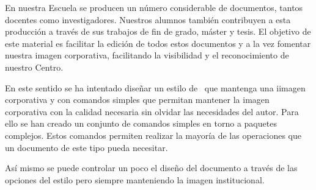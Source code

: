 En nuestra Escuela se producen un número considerable de documentos, tantos docentes
como investigadores. Nuestros alumnos también contribuyen a esta producción a
través de sus trabajos de fin de grado, máster y tesis. El objetivo de este material es facilitar
la edición de todos estos documentos y a la vez fomentar nuestra imagen corporativa,
facilitando la visibilidad y el reconocimiento de nuestro Centro.

En este sentido se ha intentado diseñar un estilo de \LaTeXe\ que mantenga una iimagen corporativa y con comandos simples que permitan mantener la imagen corporativa con la calidad necesaria sin olvidar las necesidades del autor. Para ello se han creado un conjunto de comandos simples en torno a paquetes complejos. Estos comandos permiten realizar la mayoría de las operaciones que un documento de este tipo pueda necesitar.

Así mismo se puede controlar un poco el diseño del documento a través de las opciones del estilo pero siempre manteniendo la imagen institucional. 
